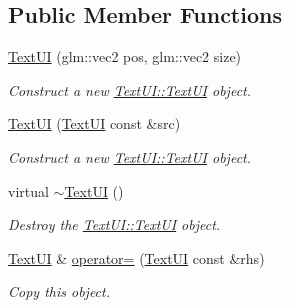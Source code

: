 \subsection*{Public Member Functions}
\begin{DoxyCompactItemize}
\item 
\hyperlink{class_text_u_i_ac985cfaf70bceed7f26d1f184836e523}{Text\+UI} (glm\+::vec2 pos, glm\+::vec2 size)
\begin{DoxyCompactList}\small\item\em Construct a new \hyperlink{class_text_u_i_ac985cfaf70bceed7f26d1f184836e523}{Text\+U\+I\+::\+Text\+UI} object. \end{DoxyCompactList}\item 
\hyperlink{class_text_u_i_ab960011cbb3e815bf698640def9974bd}{Text\+UI} (\hyperlink{class_text_u_i}{Text\+UI} const \&src)
\begin{DoxyCompactList}\small\item\em Construct a new \hyperlink{class_text_u_i_ac985cfaf70bceed7f26d1f184836e523}{Text\+U\+I\+::\+Text\+UI} object. \end{DoxyCompactList}\item 
\mbox{\label{class_text_u_i_a7117d44be6d7ba89051d90c0e4807804}} 
virtual \hyperlink{class_text_u_i_a7117d44be6d7ba89051d90c0e4807804}{$\sim$\+Text\+UI} ()
\begin{DoxyCompactList}\small\item\em Destroy the \hyperlink{class_text_u_i_ac985cfaf70bceed7f26d1f184836e523}{Text\+U\+I\+::\+Text\+UI} object. \end{DoxyCompactList}\item 
\hyperlink{class_text_u_i}{Text\+UI} \& \hyperlink{class_text_u_i_a9e461e80a257b84e3739e38364de1dd1}{operator=} (\hyperlink{class_text_u_i}{Text\+UI} const \&rhs)
\begin{DoxyCompactList}\small\item\em Copy this object. \end{DoxyCompactList}\end{DoxyCompactItemize}
